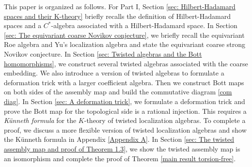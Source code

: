 \documentclass[11pt]{article}
\theoremstyle{definition}
\theoremstyle{plain}
\begin{document}
This paper is organized as follows. For Part I, Section \ref{sec: Hilbert-Hadamard spaces and their K-theory} briefly recalls the definition of Hilbert-Hadamard spaces and a $C^*$-algebra associated with a Hilbert-Hadamard space. In Section \ref{sec: The equivariant coarse Novikov conjecture}, we briefly recall the equivariant Roe algebra and Yu's localization algebra and state the equivariant coarse strong Novikov conjecture. In Section \ref{sec: Twisted algebras and the Bott homomorphisms}, we construct several twisted algebras associated with the coarse embedding. We also introduce a version of twisted algebras to formulate a deformation trick with a larger coefficient algebra. Then we construct Bott maps on both sides of the assembly map and build the commutative diagram \eqref{com diag}. In Section \ref{sec: A deformation trick}, we formulate a deformation trick and prove the Bott map for the topological side is a rational injection. This requires a \emph{K\"unneth formula} for the $K$-theory of twisted localization algebras. To complete a proof, we discuss a more flexible version of twisted localization algebras and show the K\"unneth formula in Appendix \ref{Appendix A}. In Section \ref{sec: The twisted assembly map and proof of Theorem 1.3}, we show the twisted assembly map is an isomorphism and complete the proof of Theorem \ref{main result torsion-free}.
\end{document}
